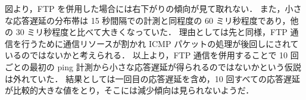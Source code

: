 \documentclass[a4j]{jarticle}
\begin{document}
図より，FTP を併用した場合には右下がりの傾向が見て取れない．
また，小さな応答遅延の分布帯は 15 秒間隔での計測と同程度の 60 ミリ秒程度であり，他の 30 ミリ秒程度と比べて大きくなっていた．
理由としては先と同様，FTP 通信を行うために通信リソースが割かれ ICMP パケットの処理が後回しにされているのではないかと考えられる．
以上より，FTP 通信を併用することで 10 回ごとの最初の ping 計測から小さな応答遅延が得られるのではないかという仮説は外れていた．
結果としては一回目の応答遅延を含め，10 回すべての応答遅延が比較的大きな値をとり，そこには減少傾向は見られないようだ．
\end{document}
